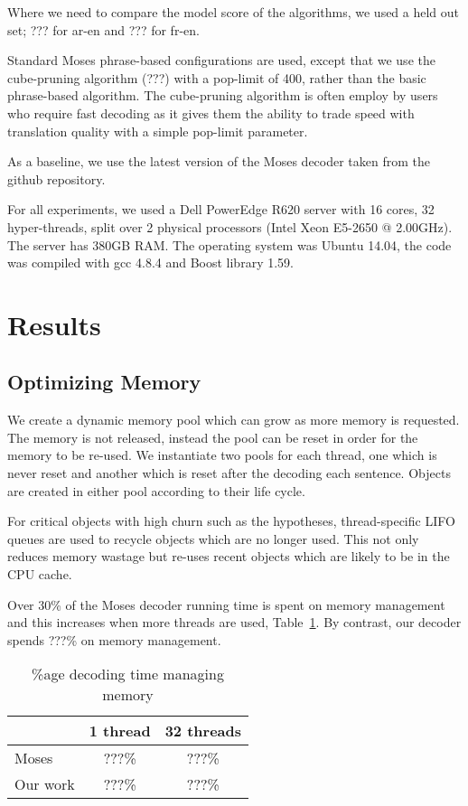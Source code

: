 \documentclass[11pt]{article}
\begin{document}
Where we need to compare the model score of the algorithms, we used a held out set; ??? for ar-en and ??? for fr-en.

Standard Moses phrase-based configurations are used, except that we use the cube-pruning algorithm (???) with a pop-limit of 400, rather than the basic phrase-based algorithm. The cube-pruning algorithm is often employ by users who require fast decoding as it gives them the ability to trade speed with translation quality with a simple pop-limit parameter.

As a baseline, we use the latest version of the Moses decoder taken from the github repository.

For all experiments, we used a Dell PowerEdge R620 server with 16 cores, 32 hyper-threads, split over 2 physical processors (Intel Xeon E5-2650 @ 2.00GHz). The server has 380GB RAM. The operating system was Ubuntu 14.04, the code was compiled with gcc 4.8.4 and Boost library 1.59.

\section{Results}

\subsection{Optimizing Memory}

We create a dynamic memory pool which can grow as more memory is requested. The memory is not released, instead the pool can be reset in order for the memory to be re-used. We instantiate two pools for each thread, one which is never reset and another which is reset after the decoding each sentence. Objects are created in either pool according to their life cycle.

For critical objects with high churn such as the hypotheses, thread-specific LIFO queues are used to recycle objects which are no longer used. This not only reduces memory wastage but re-uses recent objects which are likely to be in the CPU cache.

Over 30\% of the Moses decoder running time is spent on memory management and this increases when more threads are used, Table~\ref{tab:optimizing-memory}. By contrast, our decoder spends ???\% on memory management.
\begin{table}[h]
\begin{center}
\begin{tabular}{|l|c|c|} \hline
		& 1 thread	& 32 threads \\ \hline
Moses  		& ???\% 	& ???\% \\
Our work 	& ???\% 	& ???\% \\ \hline
\end{tabular}
\end{center}
\caption{\%age decoding time managing memory}
\label{tab:optimizing-memory}
\end{table}
\end{document}
